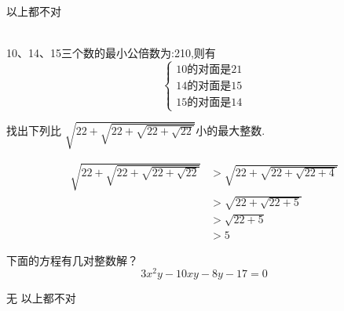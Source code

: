\documentclass[answers]{exam}
\begin{document}
\begin{questions}
	\begin{oneparchoices}
		    \choice 以上都不对
	\end{oneparchoices}
	\begin{solution}\\
		10、14、15三个数的最小公倍数为:210,则有
		\begin{equation*}
			\begin{cases}
				10\text{的对面是} 21 \\
				14\text{的对面是} 15 \\
				15\text{的对面是} 14
			\end{cases}
		\end{equation*}
	\end{solution}

	\question 找出下列比 \( \displaystyle \sqrt{22 + \sqrt{22 + \sqrt{22 + \sqrt{22}}}} \)小的最大整数.

	\begin{oneparchoices}
		    \choice 25
	\end{oneparchoices}
	\begin{solution}
		\begin{align*}
			\sqrt{22 + \sqrt{22 + \sqrt{22 + \sqrt{22}}}} & > \sqrt{22 + \sqrt{22 + \sqrt{22 + 4}}} \\
			                                              & > \sqrt{22 + \sqrt{22 + 5}}             \\
			                                              & > \sqrt{22 + 5}                         \\
			                                              & > 5
		\end{align*}
	\end{solution}

	\question 下面的方程有几对整数解？
	\begin{equation}
		3x^2y - 10xy - 8y - 17 = 0
	\end{equation}
	\begin{oneparchoices}
		\choice 无    \choice 以上都不对
	\end{oneparchoices}


\end{questions}
\end{document}
